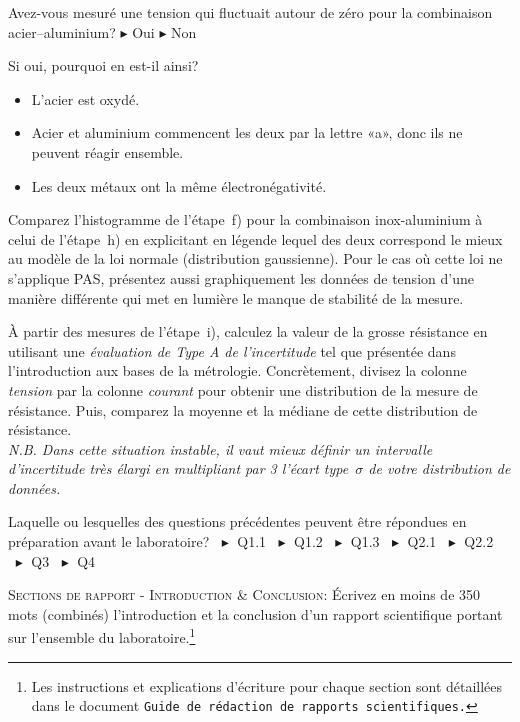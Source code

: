 \documentclass[canadien,12pt,oneside,letterpaper]{article}
\begin{document}
\begin{gradescope}
\begin{gradescope}
    \end{gradescope}
    \begin{gradescope}
    \setcounter{gradescopei}{2}
    \item Avez-vous mesuré une tension qui fluctuait autour de zéro pour la combinaison acier--aluminium? $\blacktriangleright$ Oui $\blacktriangleright$ Non
    \item Si oui, pourquoi en est-il ainsi?
        \begin{itemize}[label=$\blacktriangleright$]
        \item L'acier est oxydé.
        \item Acier et aluminium commencent les deux par la lettre «a», donc ils ne peuvent réagir ensemble.
        \item Les deux métaux ont la même électronégativité.
        \end{itemize}
    \end{gradescope}
\item Comparez l’histogramme de l’étape~f) pour la combinaison inox-aluminium à celui de l’étape~h) en explicitant en légende lequel des deux correspond le mieux au modèle de la loi normale (distribution gaussienne). Pour le cas où cette loi ne s’applique PAS, présentez aussi graphiquement les données de tension d'une manière différente qui met en lumière le manque de stabilité de la mesure.
\item À partir des mesures de l'étape~i), calculez la valeur de la grosse résistance en utilisant une \textit{évaluation de Type A de l'incertitude} tel que présentée dans l’introduction aux bases de la métrologie. Concrètement, divisez la colonne \textit{tension} par la colonne \textit{courant} pour obtenir une distribution de la mesure de résistance. Puis, comparez la moyenne et la médiane de cette distribution de résistance.\\ \textit{N.B. Dans cette situation instable, il vaut mieux définir un intervalle d'incertitude très élargi en multipliant par 3 l'écart type~$\sigma$ de votre distribution de données.}
\item Laquelle ou lesquelles des questions précédentes peuvent être répondues en préparation avant le laboratoire? $\;\blacktriangleright$ Q1.1 $\;\blacktriangleright$ Q1.2 $\;\blacktriangleright$ Q1.3 $\;\blacktriangleright$ Q2.1 $\;\blacktriangleright$ Q2.2 $\;\blacktriangleright$ Q3 $\;\blacktriangleright$ Q4
\item \textsc{Sections de rapport - Introduction \& Conclusion:} Écrivez en moins de 350 mots (combinés) l'introduction et la conclusion d'un rapport scientifique portant sur l'ensemble du laboratoire.\footnote{Les instructions et explications d'écriture pour chaque section sont détaillées dans le document \texttt{Guide de rédaction de rapports scientifiques.}}
\end{gradescope}
\end{document}
